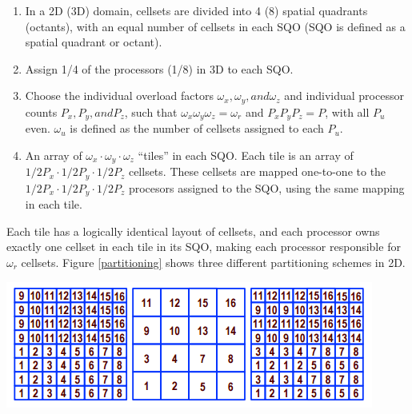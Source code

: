 \documentclass[11pt, letterpaper,titlepage,oneside]{article}
\begin{document}
\begin{enumerate}
\item In a 2D (3D) domain, cellsets are divided into 4 (8) spatial quadrants (octants), with an equal number of cellsets in each  SQO (SQO is defined as a spatial quadrant or octant).
\item Assign 1/4 of the processors (1/8) in 3D to each SQO. 
\item Choose the individual overload factors $\omega_x, \omega_y, and \omega_z$ and individual processor counts $P_x, P_y, and P_z$, such that $\omega_x \omega_y \omega_z = \omega_r$ and $P_x P_y P_z = P$, with all $P_u$ even. $\omega_u$ is defined as the number of cellsets assigned to each $P_u$.
\item An array of $\omega_x\cdot\omega_y\cdot\omega_z$ ``tiles'' in each SQO. Each tile is an array of $1/2 P_x \cdot 1/2 P_y \cdot 1/2 P_z$ cellsets. These cellsets are mapped one-to-one to the $1/2 P_x \cdot 1/2 P_y \cdot 1/2 P_z$ procesors assigned to the SQO, using the same mapping in each tile.
\end{enumerate}

Each tile has a logically identical layout of cellsets, and each processor owns exactly one cellset in each tile in its SQO, making each processor responsible for $\omega_r$ cellsets. Figure \ref{partitioning} shows three different partitioning schemes in 2D.

\noindent\begin{minipage}{\textwidth}
\centering
\includegraphics[scale = 1]{Partitioning.png}
\label{partitioning}
\end{minipage}
\end{document}
